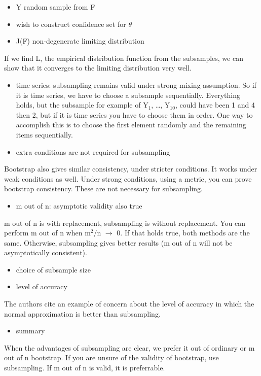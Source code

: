 \documentclass[bigger]{beamer}
\begin{document}
\begin{itemize}
\item Y random sample from F
\item wish to construct confidence set for $\theta$
\item J(F) non-degenerate limiting distribution
\end{itemize}

If we find L, the empirical distribution function from the
subsamples, we can show that it converges to the limiting
distribution very well.

\begin{itemize}
\item time series: subsampling remains valid under strong mixing
  assumption.
 So if it is time series, we have to choose a subsample sequentially.
  Everything holds, but the subsample for example of Y$_1$, \ldots,
  Y$_{\mathrm{10}}$, could have been 1 and 4 then 2, but if it is time series you
  have to choose them in order. One way to accomplish this is to
  choose the first element randomly and the remaining items
  sequentially.
\item extra conditions are not required for subsampling
\end{itemize}
Bootstrap also gives similar consistency, under stricter conditions.
It works under weak conditions as well. Under strong conditions,
using a metric, you can prove bootstrap consistency. These are not
necessary for subsampling.

\begin{itemize}
\item m out of n:  asymptotic validity also true
\end{itemize}
m out of n is with replacement, subsampling is without replacement.
You can perform m out of n when m$^2$/n $\rightarrow$ 0. If that holds
true, both methods are the same. Otherwise, subsampling gives better
results (m out of n will not be asymptotically consistent).

\begin{itemize}
\item choice of subsample size
\item level of accuracy
\end{itemize}
The authors cite an example of concern about the level of accuracy in
which the normal approximation is better than subsampling.

\begin{itemize}
\item summary
\end{itemize}
When the advantages of subsampling are clear, we prefer it out of
ordinary or m out of n bootstrap. If you are unsure of the validity
of bootstrap, use subsampling. If m out of n is valid, it is
preferrable.
\end{document}
